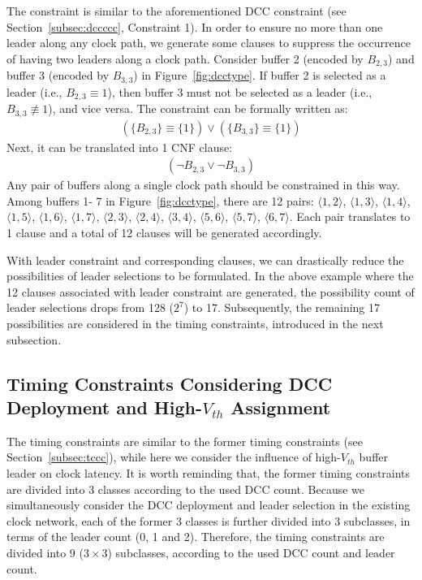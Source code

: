 The constraint is similar to the aforementioned DCC constraint (see Section~\ref{subsec:dccccc}, Constraint 1). In order to ensure no more than one leader along any clock path, we generate some clauses to suppress the occurrence of having two leaders along a clock path. Consider buffer 2 (encoded by {\fontsize{9}{10}$B_{2,3}$}) and buffer 3 (encoded by {\fontsize{9}{10}$B_{3,3}$}) in Figure~\ref{fig:dcctype}. If buffer 2 is selected as a leader (i.e., {\fontsize{9}{10}${B_{2,3}} \equiv {1}$}), then buffer 3 must not be selected as a leader (i.e., {\fontsize{9}{10}$B_{3,3} \not\equiv {1}$}), and vice versa. The constraint can be formally written as:
{\fontsize{9}{10}
\begin{gather*}
\left(\{B_{2,3}\} \equiv \{1\}\right) \lor \left(\{B_{3,3}\} \equiv \{1\}\right)
\end{gather*}}
Next, it can be translated into 1 CNF clause:
{\fontsize{9}{10}
\begin{equation*}
\begin{split}
(\neg B_{2,3}\lor\neg B_{3,3})
\end{split}
\end{equation*}}
Any pair of buffers along a single clock path should be constrained in this way. Among buffers 1- 7 in Figure~\ref{fig:dcctype}, there are 12 pairs: $\langle1, 2\rangle$, $\langle1, 3\rangle$, $\langle1, 4\rangle$, $\langle1, 5\rangle$, $\langle1, 6\rangle$, $\langle1, 7\rangle$, $\langle2, 3\rangle$, $\langle2, 4\rangle$, $\langle3, 4\rangle$, $\langle5, 6\rangle$, $\langle5, 7\rangle$, $\langle6, 7\rangle$. Each pair translates to 1 clause and a total of 12 clauses will be generated accordingly.

With leader constraint and corresponding clauses, we can drastically reduce the possibilities of leader selections to be formulated. In the above example where the 12 clauses associated with leader constraint are generated, the possibility count of leader selections drops from 128 ($2^7$) to 17. Subsequently, the remaining 17 possibilities are considered in the timing constraints, introduced in the next subsection.

\subsection{Timing Constraints Considering DCC Deployment and High-$V_{th}$ Assignment}
\label{sec:VTA:timing}
The timing constraints are similar to the former timing constraints (see Section~\ref{subsec:tccc}), while here we consider the influence of high-$V_{th}$ buffer leader on clock latency. It is worth reminding that, the former timing constraints are divided into 3 classes according to the used DCC count. Because we simultaneously consider the DCC deployment and leader selection in the existing clock network, each of the former 3 classes is further divided into 3 subclasses, in terms of the leader count (0, 1 and 2). Therefore, the timing constraints are divided into 9 ($3 \times 3$) subclasses, according to the used DCC count and leader count.

